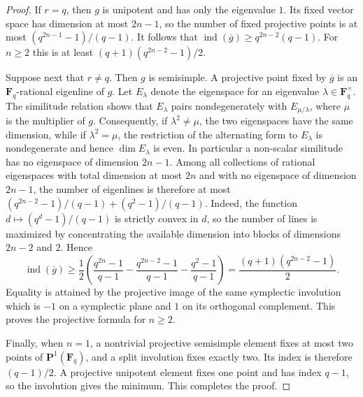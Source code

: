 \documentclass[10pt,a4paper]{amsart}
\newcommand{\F}{\mathbf F}
\newcommand{\PP}{\mathbf P}
\newcommand{\ind}{\operatorname{ind}}
\begin{document}
\begin{proof}
If $r=q$, then $g$ is unipotent and has only the eigenvalue $1$.  Its
fixed vector space has dimension at most $2n-1$, so the number of fixed projective points is at most $(q^{2n-1}-1)/(q-1)$. It follows that $\ind(\overline g)\geq q^{2n-2}(q-1)$.
For $n\geq2$ this is at least
$(q+1)(q^{2n-2}-1)/2$.

Suppose next that $r\neq q$.  Then $g$ is semisimple.  A projective
point fixed by $\overline g$ is an $\F_q$-rational eigenline of $g$.
Let $E_\lambda$ denote the eigenspace for an eigenvalue
$\lambda\in\F_q^\times$.  The similitude relation shows that
$E_\lambda$ pairs nondegenerately with $E_{\mu/\lambda}$, where
$\mu$ is the multiplier of $g$.  Consequently, if
$\lambda^2\neq\mu$, the two eigenspaces have the same dimension, while
if $\lambda^2=\mu$, the restriction of the alternating form to
$E_\lambda$ is nondegenerate and hence $\dim E_\lambda$ is even.  In
particular a non-scalar similitude has no eigenspace of dimension
$2n-1$.  Among all collections of rational eigenspaces with total
dimension at most $2n$ and with no eigenspace of dimension $2n-1$, the
number of eigenlines is therefore at most $(q^{2n-2}-1)/(q-1)+(q^2-1)/(q-1)$.
Indeed, the function $d\mapsto(q^d-1)/(q-1)$ is strictly convex in
$d$, so the number of lines is maximized by concentrating the available
dimension into blocks of dimensions $2n-2$ and $2$.  Hence
\[
 \ind(\overline g)
 \geq
 \frac12\left(
 \frac{q^{2n}-1}{q-1}
 -\frac{q^{2n-2}-1}{q-1}
 -\frac{q^2-1}{q-1}\right)
 =\frac{(q+1)(q^{2n-2}-1)}2.
\]
Equality is attained by the projective image of the same symplectic
involution which is $-1$ on a symplectic plane and $1$ on its
orthogonal complement.  This proves the projective formula for
$n\geq2$.

Finally, when $n=1$, a nontrivial projective semisimple element fixes at
most two points of $\PP^1(\F_q)$, and a split involution fixes exactly
two.  Its index is therefore $(q-1)/2$.  A projective unipotent element
fixes one point and has index $q-1$, so the involution gives the
minimum.  This completes the proof.
\end{proof}
\end{document}
